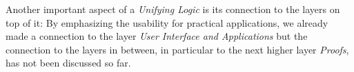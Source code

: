 Another important aspect of a \emph{Unifying Logic} %
 is its connection to the layers on top of it:
 By emphasizing the usability for practical applications, 
 we already made a connection 
 to the layer \emph{User Interface and Applications} but the connection to the layers in between, in particular to the next higher layer \emph{Proofs}, has not been discussed so far.
%
